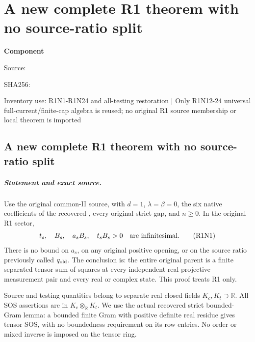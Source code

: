 \chapter{A new complete R1 theorem with no source-ratio split}
\label{component:pbaab204a8ab1}
\noindent\textbf{Component }\par
{\small\noindent Source: \par}
{\small\noindent SHA256: \par}
{\small\noindent Inventory use: R1N1-R1N24 and all-testing restoration | Only R1N12-24 universal full-current/finite-cap algebra is reused; no original R1 source membership or local theorem is imported\par}
\medskip
\section{A new complete R1 theorem with no source-ratio split}
\label{pbaab204a8ab1:sec:new-r1-all-tests}

\paragraph{Statement and exact source.}
Use the original common-II source, with $d=1$, $\lambda=\beta=0$,
the six native coefficients of the recovered
, every original strict gap,
and $n\geq0$.  In the original R1 sector,
\[
 t_s,\quad B_s,\quad a_sB_s,\quad t_sB_s>0
 \quad\hbox{are infinitesimal}.                         \tag{R1N1}
\]
There is no bound on $a_s$, on any original positive opening, or on
the source ratio previously called $q_{\rm old}$.  The conclusion is:
the entire original parent is a finite separated tensor sum of
squares at every independent real projective measurement pair and
every real or complex state.  This proof treats R1 only.

Source and testing quantities belong to separate real closed fields
$K_c,K_t\supset\mathbb R$.  All SOS assertions are in
$K_c\otimes_{\mathbb R}K_t$.  We use the actual recovered strict
bounded-Gram lemma: a bounded finite Gram with positive definite
real residue gives tensor SOS, with no boundedness requirement on
its row entries.  No order or mixed inverse is imposed on the
tensor ring.

